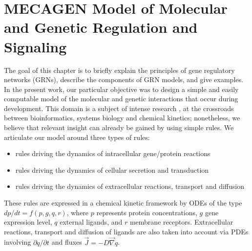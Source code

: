 


\section{MECAGEN Model of Molecular and Genetic Regulation and Signaling}


The goal of this chapter is to briefly explain the principles of gene regulatory networks (GRNs), describe the components of GRN models, and give examples. In the present work, our particular objective was to design a simple and easily computable model of the molecular and genetic interactions that occur during development. This domain is a subject of intense research \cite{Wilczynski:2010jz}\cite{BenTaboudeLeon:2009vd}\cite{Giacomantonio:2010cl}, at the crossroads between bioinformatics, systems biology and chemical kinetics; nonetheless, we believe that relevant insight can already be gained by using simple rules. We articulate our model around three types of rules:
\begin{itemize}
	\item rules driving the dynamics of intracellular gene/protein reactions
	\item rules driving the dynamics of cellular secretion and transduction
	\item rules driving the dynamics of extracellular reactions, transport and diffusion
\end{itemize}

  These rules are expressed in a chemical kinetic framework by ODEs of the type $dp/dt=f(p,g,q,r)$, where $p$ represents protein concentrations, $g$ gene expression level, $q$ external ligands, and $r$ membrane receptors. Extracellular reactions, transport and diffusion of ligands are also taken into account via PDEs involving $\partial q/\partial t$ and fluxes $\vec{J}=-D\vec{\nabla}q$. 

